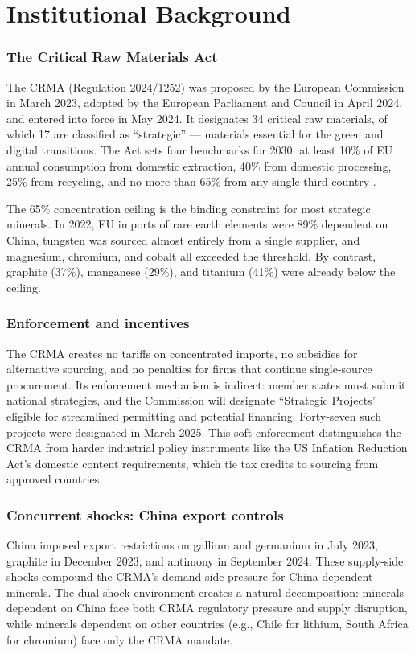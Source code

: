 \documentclass[12pt]{article}
\begin{document}
\section{Institutional Background}

\subsubsection*{The Critical Raw Materials Act} The CRMA (Regulation 2024/1252) was proposed by the European Commission in March 2023, adopted by the European Parliament and Council in April 2024, and entered into force in May 2024. It designates 34 critical raw materials, of which 17 are classified as ``strategic'' --- materials essential for the green and digital transitions. The Act sets four benchmarks for 2030: at least 10\% of EU annual consumption from domestic extraction, 40\% from domestic processing, 25\% from recycling, and no more than 65\% from any single third country \citep{europeancommission2024crma}.

The 65\% concentration ceiling is the binding constraint for most strategic minerals. In 2022, EU imports of rare earth elements were 89\% dependent on China, tungsten was sourced almost entirely from a single supplier, and magnesium, chromium, and cobalt all exceeded the threshold. By contrast, graphite (37\%), manganese (29\%), and titanium (41\%) were already below the ceiling.

\subsubsection*{Enforcement and incentives} The CRMA creates no tariffs on concentrated imports, no subsidies for alternative sourcing, and no penalties for firms that continue single-source procurement. Its enforcement mechanism is indirect: member states must submit national strategies, and the Commission will designate ``Strategic Projects'' eligible for streamlined permitting and potential financing. Forty-seven such projects were designated in March 2025. This soft enforcement distinguishes the CRMA from harder industrial policy instruments like the US Inflation Reduction Act's domestic content requirements, which tie tax credits to sourcing from approved countries.

\subsubsection*{Concurrent shocks: China export controls} China imposed export restrictions on gallium and germanium in July 2023, graphite in December 2023, and antimony in September 2024. These supply-side shocks compound the CRMA's demand-side pressure for China-dependent minerals. The dual-shock environment creates a natural decomposition: minerals dependent on China face both CRMA regulatory pressure and supply disruption, while minerals dependent on other countries (e.g., Chile for lithium, South Africa for chromium) face only the CRMA mandate.
\end{document}

